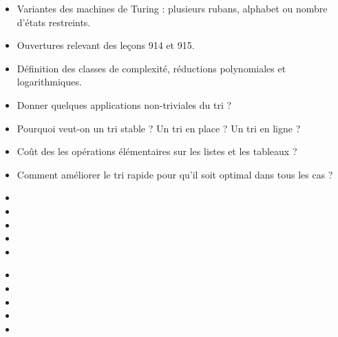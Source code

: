 \documentclass{agregfiche}
\begin{document}
\secidees

\begin{itemize}
    \item Variantes des machines de Turing : plusieurs rubans, alphabet ou nombre d'états restreints.
    \item Ouvertures relevant des leçons 914 et 915.
    \item Définition des classes de complexité, réductions polynomiales et logarithmiques.
\end{itemize}

\secquestionsclassiques

\begin{itemize}
    \item Donner quelques applications non-triviales du tri ?
    \item Pourquoi veut-on un tri stable ? Un tri en place ? Un tri en ligne ?
    \item Coût des les opérations élémentaires sur les listes et les tableaux ?
    \item Comment améliorer le tri rapide pour qu'il soit optimal dans tous les cas ?
\end{itemize}

\secreferences

\begin{itemize}
    \item 
    \item {}
    \item {}
    \item {}
    \item {}
\end{itemize}


\secdev

\begin{itemize}
    \item {}
    \item {}
    \item {}
    \item {}
    \item {}
\end{itemize}
\end{document}
